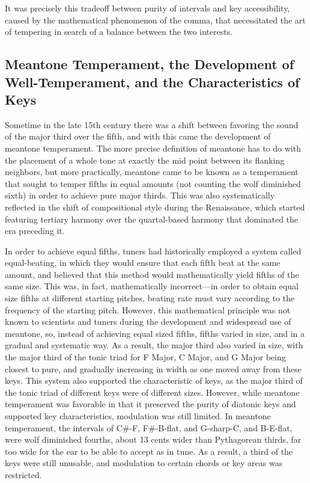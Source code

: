 It was precisely this tradeoff between purity of intervals and key
accessibility, caused by the mathematical phenomenon of the comma, that
necessitated the art of tempering in search of a balance between the two
interests.

\subsection{Meantone Temperament, the Development of Well-Temperament,
and the Characteristics of
Keys}\label{meantone-temperament-the-development-of-well-temperament-and-the-characteristics-of-keys}

Sometime in the late 15th century there was a shift between favoring the
sound of the major third over the fifth, and with this came the
development of meantone temperament. The more precise definition of
meantone has to do with the placement of a whole tone at exactly the mid
point between its flanking neighbors, but more practically, meantone
came to be known as a temperament that sought to temper fifths in equal
amounts (not counting the wolf diminished sixth) in order to achieve
pure major thirds. This was also systematically reflected in the shift
of compositional style during the Renaissance, which started featuring
tertiary harmony over the quartal-based harmony that dominated the era
preceding it.

In order to achieve equal fifths, tuners had historically employed a
system called equal-beating, in which they would ensure that each fifth
beat at the same amount, and believed that this method would
mathematically yield fifths of the same size. This was, in fact,
mathematically incorrect---in order to obtain equal size fifths at
different starting pitches, beating rate must vary according to the
frequency of the starting pitch. However, this mathematical principle
was not known to scientists and tuners during the development and
widespread use of meantone, so, instead of achieving equal sized fifths,
fifths varied in size, and in a gradual and systematic way. As a result,
the major third also varied in size, with the major third of the tonic
triad for F Major, C Major, and G Major being closest to pure, and
gradually increasing in width as one moved away from these keys. This
system also supported the characteristic of keys, as the major third of
the tonic triad of different keys were of different sizes. However,
while meantone temperament was favorable in that it preserved the purity
of diatonic keys and supported key characteristics, modulation was still
limited. In meantone temperament, the intervals of C\#-F, F\#-B-flat,
and G-sharp-C, and B-E-flat, were wolf diminished fourths, about 13
cents wider than Pythagorean thirds, far too wide for the ear to be able
to accept as in tune. As a result, a third of the keys were still
unusable, and modulation to certain chords or key areas was restricted.

